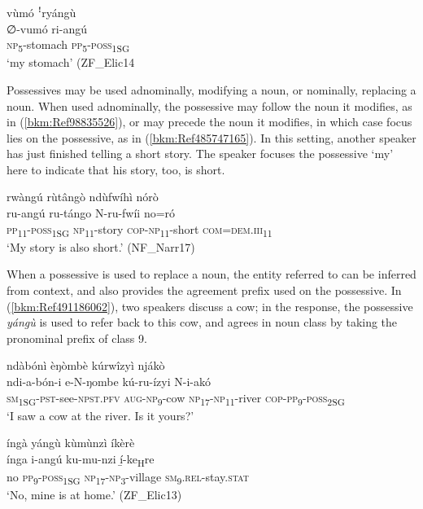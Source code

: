 \ea
\label{bkm:Ref98835526}
\label{bkm:Ref450574530}
vùmó ꜝryángù\\
\gll ∅-vumó  ri-angú\\
\textsc{np}\textsubscript{5}-stomach  \textsc{pp}\textsubscript{5}-\textsc{poss}\textsubscript{1SG}\\
\glt ‘my stomach’ (ZF\_Elic14
\z

Possessives may be used adnominally, modifying a noun, or nominally, replacing a noun. When used adnominally, the possessive may follow the noun it modifies, as in (\ref{bkm:Ref98835526}), or may precede the noun it modifies, in which case focus lies on the possessive, as in (\ref{bkm:Ref485747165}). In this setting, another speaker has just finished telling a short story. The speaker focuses the possessive ‘my’ here to indicate that his story, too, is short.

\ea
\label{bkm:Ref485747165}
rwàngú rùtângò ndùfwíhì nórò\\
\gll ru-angú  ru-tángo  N-ru-fwíi    no=ró\\
\textsc{pp}\textsubscript{11}-\textsc{poss}\textsubscript{1SG}  \textsc{np}\textsubscript{11}-story  \textsc{cop}-\textsc{np}\textsubscript{11}-short  \textsc{com}=\textsc{dem}.\textsc{iii}\textsubscript{11}\\
\glt ‘My story is also short.’ (NF\_Narr17)
\z

When a possessive is used to replace a noun, the entity referred to can be inferred from context, and also provides the agreement prefix used on the possessive. In (\ref{bkm:Ref491186062}), two speakers discuss a cow; in the response, the possessive \textit{yángù} is used to refer back to this cow, and agrees in noun class by taking the pronominal prefix of class 9.

\ea
\label{bkm:Ref491186062}
\ea
ndàbónì èŋòmbè kúrwîzyì njákò\\
\gll ndi-a-bón-i      e-N-ŋombe    kú-ru-ízyi N-i-akó \\
\textsc{sm}\textsubscript{1SG}-\textsc{pst}-see-\textsc{npst}.\textsc{pfv}  \textsc{aug}\--\textsc{np}\textsubscript{9}-cow  \textsc{np}\textsubscript{17}-\textsc{np}\textsubscript{11}-river \textsc{cop}-\textsc{pp}\textsubscript{9}-\textsc{poss}\textsubscript{2SG}\\
\glt ‘I saw a cow at the river. Is it yours?’

\ex
íngà yángù kùmùnzì íkèrè\\
\gll ínga  i-angú    ku-mu-nzi    í̲-ke\textsubscript{H}re\\
no  \textsc{pp}\textsubscript{9}-\textsc{poss}\textsubscript{1SG} \textsc{np}\textsubscript{17}-\textsc{np}\textsubscript{3}-village  \textsc{sm}\textsubscript{9}.\textsc{rel}-stay.\textsc{stat}\\
\glt ‘No, mine is at home.’ (ZF\_Elic13)
\z\z

